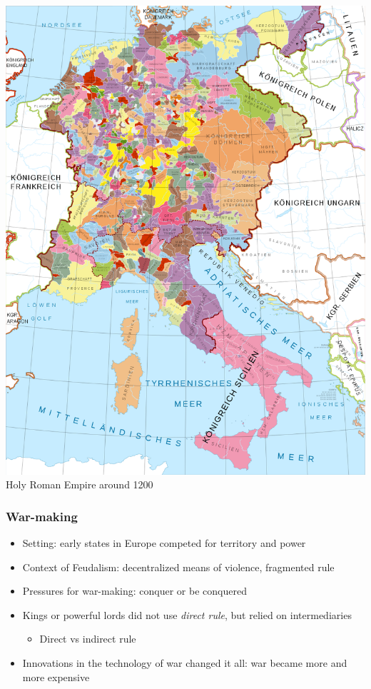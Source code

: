 \documentclass[utf8, xcolor=dvipsnames, handout]{beamer}
\begin{document}
\begin{frame}
\begin{minipage}{0.49\textwidth}
  \includegraphics[width = \textwidth]{img/holy_roman_empire_1200}\\
  {\small Holy Roman Empire around 1200}
\end{minipage}

\end{frame}

\begin{frame}
\frametitle{War-making}
\centering

\begin{itemize}[<+->]
\item Setting: early states in Europe competed for territory and power
\item Context of Feudalism: decentralized means of violence, fragmented rule
\item Pressures for war-making: conquer or be conquered
\item Kings or powerful lords did not use \textit{direct rule}, but relied on intermediaries
\begin{itemize}
  \item Direct vs indirect rule
\end{itemize}
\item Innovations in the technology of war changed it all: war became more and more expensive
\end{itemize}

\end{frame}
\end{document}
